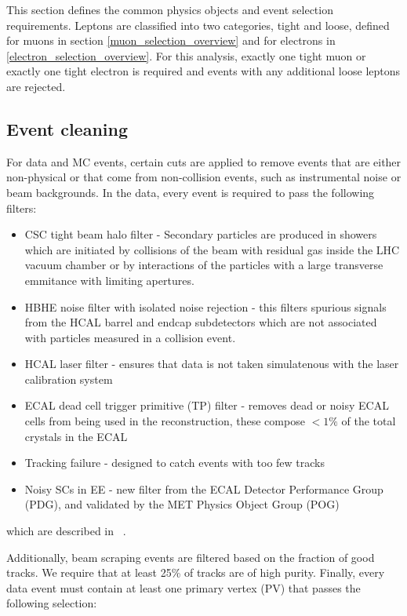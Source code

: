 \par This section defines the common physics objects and event
selection requirements.  Leptons are classified into two categories,
tight and loose, defined for muons in section
\ref{muon_selection_overview} and for electrons in
\ref{electron_selection_overview}.  For this analysis, exactly one
tight muon or exactly one tight electron is required and events with
any additional loose leptons are rejected. 


\subsection{Event cleaning}
\label{event_cleaning_overview}

\par For data and MC events, certain cuts are applied to remove events
that are either non-physical or that come from non-collision events,
such as instrumental noise or beam backgrounds.  In the data, every
event is required to pass the following filters:

\begin{itemize}
  \item CSC tight beam halo filter - Secondary particles are produced
    in showers which are initiated by collisions of the beam with
    residual gas inside the LHC vacuum chamber or by interactions of
    the particles with a large transverse emmitance with limiting
    apertures.   
  \item HBHE noise filter with isolated noise rejection - this filters
    spurious signals from the HCAL barrel and endcap subdetectors which
    are not associated with particles measured in a collision event. 
  \item HCAL laser filter - ensures that data is not taken
    simulatenous with the laser calibration system
  \item ECAL dead cell trigger primitive (TP) filter - removes dead
    or noisy ECAL cells from being used in the reconstruction, these
    compose $<1\%$ of the total crystals in the ECAL
  \item Tracking failure - designed to catch events with too few tracks
  \item Noisy SCs in EE - new filter from the ECAL Detector
    Performance Group (PDG), and validated by the MET Physics Object
    Group (POG)
\end{itemize}

\noindent which are described in ~\cite{METfilters}.

\par Additionally, beam scraping events are filtered based on the fraction
of good tracks.  We require that at least 25\% of tracks are of high
purity.  Finally, every data event must contain at least one primary
vertex (PV) that passes the following selection:


